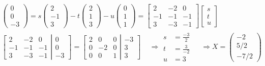 \documentclass[twoside]{amsart}
\theoremstyle{plain}
\theoremstyle{definition}
\begin{document}
\[
\begin{gathered}
  \left( \begin{matrix} 0 \\ 0 \\ -3 \end{matrix} \right) = s \left( \begin{matrix} 2 \\ -1 \\ 3 \end{matrix} \right)  -t \left( \begin{matrix} 2 \\ 1 \\ 3 \end{matrix} \right) - u \left( \begin{matrix} 0 \\ 1 \\ 1 \end{matrix} \right) = \left[ \begin{matrix} 2 & -2 & 0 \\ -1 & -1 & -1 \\ 3 & -3 & -1 \end{matrix} \right]\left[ \begin{matrix} s \\ t \\ u \end{matrix} \right] \\
  \left[ \begin{matrix} 2 & - 2 & 0 \\ -1 & - 1 & -1  \\ 3 & -3 & -1 \end{matrix} \right| \left. \begin{matrix} 0 \\ 0 \\ -3 \end{matrix} \right] = \left[ \begin{matrix} 2 & 0 & 0 \\ 0 & -2 & 0 \\ 0 & 0 & 1 \end{matrix} \right| \left. \begin{matrix} -3 \\ 3 \\ 3 \end{matrix} \right] \quad \, \Longrightarrow \begin{aligned} s & = \frac{-3}{2} \\ t & = \frac{3}{-2} \\ u & = 3 \end{aligned}  \quad \, \Longrightarrow \boxed{ X = \left( \begin{matrix} -2 \\ 5/2 \\ -7/2 \end{matrix} \right) }
\end{gathered}
\]
\end{document}
